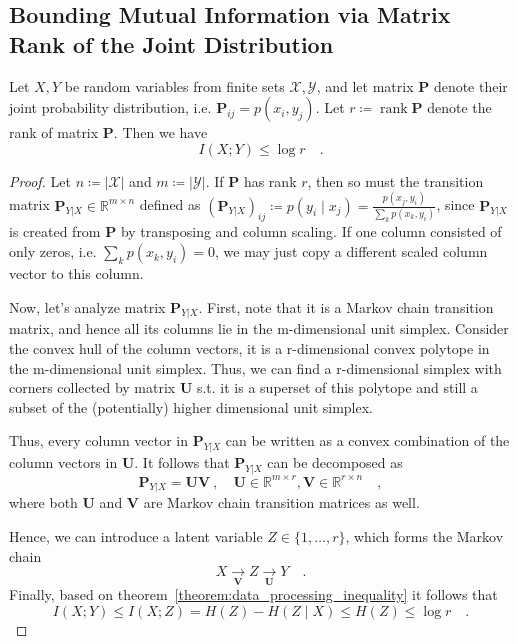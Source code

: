 \documentclass[../../main.tex]{subfiles}
\begin{document}
\subsection{Bounding Mutual Information via Matrix Rank of the Joint Distribution}
\begin{theorem}
    \label{theorem:mutual_information_is_bounded_by_log_rank}
    Let $X, Y$ be random variables from finite sets $\mathcal{X, Y}$, and let matrix $\bm{P}$ denote their joint probability distribution, i.e. $\bm{P}_{ij} = p(x_i, y_j)$. Let $r \coloneqq \operatorname{rank} \bm{P}$ denote the rank of matrix $\bm{P}$. Then we have
    \[
        I(X; Y) \leq \log r \quad .
    \]
\end{theorem}
\begin{proof}
    Let $n \coloneqq |\mathcal{X}|$ and $m \coloneqq |\mathcal{Y}|$. If $\bm{P}$ has rank $r$, then so must the transition matrix $\bm{P}_{Y|X} \in \mathbb{R}^{m \times n}$ defined as $(\bm{P}_{Y|X})_{ij} \coloneqq p(y_i \mid x_j) = \frac{p(x_j, y_i)}{\sum_{k} p(x_k, y_i)}$, since $\bm{P}_{Y|X}$ is created from $\bm{P}$ by transposing and column scaling. If one column consisted of only zeros, i.e. $\sum_{k} p(x_k, y_i) = 0$, we may just copy a different scaled column vector to this column.

    Now, let's analyze matrix $\bm{P}_{Y|X}$. First, note that it is a Markov chain transition matrix, and hence all its columns lie in the m-dimensional unit simplex. Consider the convex hull of the column vectors, it is a r-dimensional convex polytope in the m-dimensional unit simplex. Thus, we can find a r-dimensional simplex with corners collected by matrix $\bm{U}$ s.t. it is a superset of this polytope and still a subset of the (potentially) higher dimensional unit simplex. 

    Thus, every column vector in $\bm{P}_{Y|X}$ can be written as a convex combination of the column vectors in $\bm{U}$. It follows that $\bm{P}_{Y|X}$ can be decomposed as
    \[
        \bm{P}_{Y|X} = \bm{UV} \ , \quad \bm{U} \in \mathbb{R}^{m \times r}, \bm{V} \in \mathbb{R}^{r \times n} \quad ,
    \]
    where both $\bm{U}$ and $\bm{V}$ are Markov chain transition matrices as well.

    Hence, we can introduce a latent variable $Z \in \{ 1, \dots , r \}$, which forms the Markov chain
    \[
        X \underset{\bm{V}}{\to} Z \underset{\bm{U}}{\to} Y \quad .
    \]
    Finally, based on theorem~\ref{theorem:data_processing_inequality} it follows that
    \[
        I(X; Y) \leq I(X; Z) = H(Z) - H(Z \mid X) \leq H(Z) \leq \log r \quad .
    \]
\end{proof}
\end{document}

